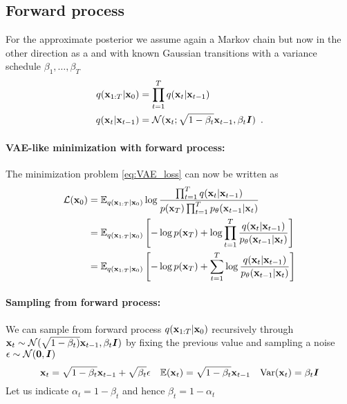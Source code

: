 \subsection{Forward process}

For the approximate posterior we assume again a Markov chain but now in the other direction as a  and with known Gaussian transitions with a variance schedule $\beta_1, \ldots, \beta_T$
\begin{align*}
    q({\mathbf{x}}_{1:T} | {\mathbf{x}}_0) &= \prod_{t=1}^T q({\mathbf{x}}_{t} | {\mathbf{x}}_{t-1}) \\
    q({\mathbf{x}}_{t} | {\mathbf{x}}_{t-1}) &= \mathcal{N}({\mathbf{x}}_{t}; \sqrt{1-\beta_t} {\mathbf{x}}_{t-1}, \beta_t {\bm{I}}) \enspace .
\end{align*}

\paragraph{VAE-like minimization with forward process:} 
The minimization problem \eqref{eq:VAE_loss} can now be written as
\begin{align}\label{eq:VAE_fwd}
    \mathcal{L}({\mathbf{x}}_0) &= \mathbb{E}_{q({\mathbf{x}}_{1:T} | {\mathbf{x}}_0)} \log \frac{\prod_{t=1}^T q({\mathbf{x}}_{t} | {\mathbf{x}}_{t-1})}{p({\mathbf{x}}_T) \prod_{t=1}^T p_{\theta}({\mathbf{x}}_{t-1} | {\mathbf{x}}_t) } \nonumber \\
    &= \mathbb{E}_{q({\mathbf{x}}_{1:T} | {\mathbf{x}}_0)} \left[ - \log p({\mathbf{x}}_T) + \log \prod_{t=1}^T \frac{q({\mathbf{x}}_{t} | {\mathbf{x}}_{t-1})}{p_{\theta}({\mathbf{x}}_{t-1} | {\mathbf{x}}_t) } \right] \nonumber \\
    &= \mathbb{E}_{q({\mathbf{x}}_{1:T} | {\mathbf{x}}_0)} \left[ - \log p({\mathbf{x}}_T) + \sum_{t=1}^T \log \frac{q({\mathbf{x}}_{t} | {\mathbf{x}}_{t-1})}{p_{\theta}({\mathbf{x}}_{t-1} | {\mathbf{x}}_t) } \right]
\end{align}


\paragraph{Sampling from forward process:}
We can sample from forward process $q({\mathbf{x}}_{1:T} | {\mathbf{x}}_0)$ recursively through ${\mathbf{x}}_t \sim \mathcal{N}(\sqrt{1-\beta_t)} {\mathbf{x}}_{t-1}, \beta_t {\bm{I}})$ by fixing the previous value and sampling a noise ${\mathbf{\epsilon}} \sim \mathcal{N}(\mathbf{0}, {\bm{I}})$
\begin{equation}
{\mathbf{x}}_t = \sqrt{1-\beta_t} {\mathbf{x}}_{t-1} + \sqrt{\beta_t} {\mathbf{\epsilon}} \quad 
\mathbb{E}({\mathbf{x}}_t) = \sqrt{1-\beta_t} {\mathbf{x}}_{t-1} \quad
\mathrm{Var}({\mathbf{x}}_t) = \beta_t {\bm{I}}
\end{equation}
Let us indicate $\alpha_t = 1-\beta_t$ and hence $\beta_t = 1-\alpha_t$

